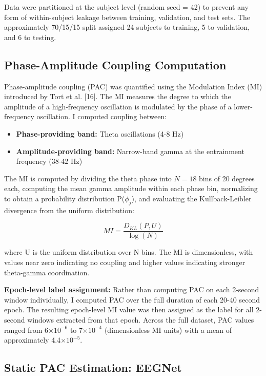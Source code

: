 \documentclass[11pt,letterpaper]{article}
\begin{document}
Data were partitioned at the subject level (random seed = 42) to prevent any form of within-subject leakage between training, validation, and test sets. The approximately 70/15/15 split assigned 24 subjects to training, 5 to validation, and 6 to testing.

\subsection{Phase-Amplitude Coupling Computation}

Phase-amplitude coupling (PAC) was quantified using the Modulation Index (MI) introduced by Tort et al. [16]. The MI measures the degree to which the amplitude of a high-frequency oscillation is modulated by the phase of a lower-frequency oscillation. I computed coupling between:

\begin{itemize}[nosep]
  \item \textbf{Phase-providing band:} Theta oscillations (4-8 Hz)
  \item \textbf{Amplitude-providing band:} Narrow-band gamma at the entrainment frequency (38-42 Hz)
\end{itemize}

The MI is computed by dividing the theta phase into $N = 18$ bins of 20 degrees each, computing the mean gamma amplitude within each phase bin, normalizing to obtain a probability distribution P($\phi_j$), and evaluating the Kullback-Leibler divergence from the uniform distribution:

\begin{equation}
  MI = \frac{D_{KL}(P, U)}{\log(N)}
\end{equation}

where U is the uniform distribution over N bins. The MI is dimensionless, with values near zero indicating no coupling and higher values indicating stronger theta-gamma coordination.

\textbf{Epoch-level label assignment:} Rather than computing PAC on each 2-second window individually, I computed PAC over the full duration of each 20-40 second epoch. The resulting epoch-level MI value was then assigned as the label for all 2-second windows extracted from that epoch. Across the full dataset, PAC values ranged from 6$\times 10^{-6}$ to 7$\times 10^{-4}$ (dimensionless MI units) with a mean of approximately 4.4$\times 10^{-5}$.

\subsection{Static PAC Estimation: EEGNet}
\end{document}
